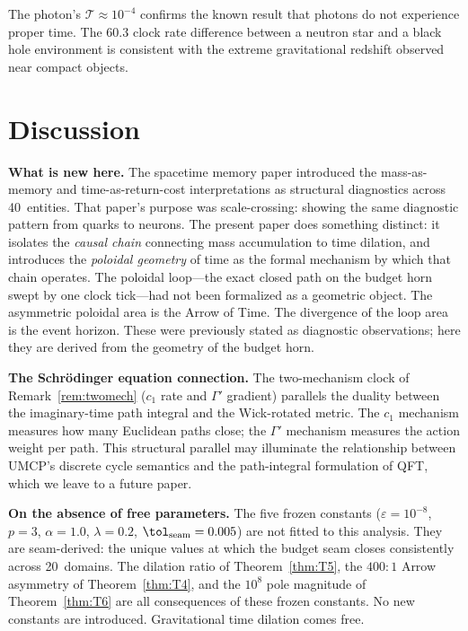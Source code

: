 \documentclass[
  aps,
  prd,
  twocolumn,
  superscriptaddress,
  nofootinbib,
  floatfix
]{revtex4-2}
\newcommand{\Gam}{\Gamma}
\newcommand{\eps}{\varepsilon}
\newcommand{\Tres}{\mathcal{T}}
\begin{document}
The photon's $\Tres \approx 10^{-4}$ confirms the known
result that photons do not experience proper time.  The
$60.3$ clock rate difference between a neutron star and a
black hole environment is consistent with the extreme
gravitational redshift observed near compact objects.

\section{Discussion}\label{sec:discussion}

\textbf{What is new here.}  The spacetime memory paper
\cite{paulus2026spacetimememory} introduced the mass-as-memory
and time-as-return-cost interpretations as structural
diagnostics across 40~entities.  That paper's purpose was
scale-crossing: showing the same diagnostic pattern from
quarks to neurons.  The present paper does something
distinct: it isolates the \emph{causal chain} connecting
mass accumulation to time dilation, and introduces the
\emph{poloidal geometry} of time as the formal mechanism
by which that chain operates.  The poloidal loop---the
exact closed path on the budget horn swept by one clock
tick---had not been formalized as a geometric object.
The asymmetric poloidal area is the Arrow of Time.
The divergence of the loop area is the event horizon.
These were previously stated as diagnostic observations;
here they are derived from the geometry of the budget horn.

\textbf{The Schrödinger equation connection.}  The two-mechanism
clock of Remark~\ref{rem:twomech} ($c_1$ rate and $\Gam'$
gradient) parallels the duality between the imaginary-time
path integral and the Wick-rotated metric.  The $c_1$
mechanism measures how many Euclidean paths close; the
$\Gam'$ mechanism measures the action weight per path.
This structural parallel may illuminate the relationship
between UMCP's discrete cycle semantics and the
path-integral formulation of QFT, which we leave to a
future paper.

\textbf{On the absence of free parameters.}  The five frozen
constants ($\eps = 10^{-8}$, $p = 3$, $\alpha = 1.0$,
$\lambda = 0.2$, $\tol_{\mathrm{seam}} = 0.005$) are not
fitted to this analysis.  They are seam-derived: the unique
values at which the budget seam closes consistently across
20~domains.  The dilation ratio of Theorem~\ref{thm:T5},
the $400:1$ Arrow asymmetry of Theorem~\ref{thm:T4}, and
the $10^8$ pole magnitude of Theorem~\ref{thm:T6} are all
consequences of these frozen constants.  No new constants
are introduced.  Gravitational time dilation comes free.
\end{document}
